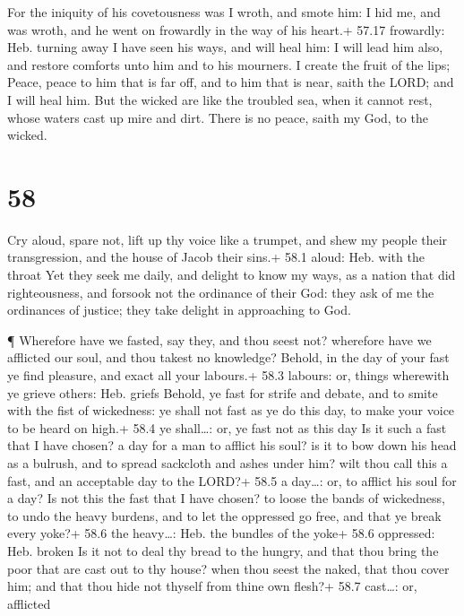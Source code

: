  For the iniquity of his covetousness was I wroth, and
smote him: I hid me, and was wroth, and he went on frowardly in the way
of his heart.+ 57.17 frowardly: Heb. turning away  I have
seen his ways, and will heal him: I will lead him also, and restore
comforts unto him and to his mourners.  I create the fruit
of the lips; Peace, peace to him that is far off, and to him that is
near, saith the LORD; and I will heal him.  But the wicked
are like the troubled sea, when it cannot rest, whose waters cast up
mire and dirt.  There is no peace, saith my God, to the
wicked.

\hypertarget{section-57}{%
\section{58}\label{section-57}}

 Cry aloud, spare not, lift up thy voice like a trumpet, and
shew my people their transgression, and the house of Jacob their sins.+
58.1 aloud: Heb. with the throat  Yet they seek me daily,
and delight to know my ways, as a nation that did righteousness, and
forsook not the ordinance of their God: they ask of me the ordinances of
justice; they take delight in approaching to God.

 ¶ Wherefore have we fasted, say they, and thou seest not?
wherefore have we afflicted our soul, and thou takest no knowledge?
Behold, in the day of your fast ye find pleasure, and exact all your
labours.+ 58.3 labours: or, things wherewith ye grieve others: Heb.
griefs  Behold, ye fast for strife and debate, and to smite
with the fist of wickedness: ye shall not fast as ye do this day, to
make your voice to be heard on high.+ 58.4 ye shall\ldots: or, ye fast
not as this day  Is it such a fast that I have chosen? a day
for a man to afflict his soul? is it to bow down his head as a bulrush,
and to spread sackcloth and ashes under him? wilt thou call this a fast,
and an acceptable day to the LORD?+ 58.5 a day\ldots: or, to afflict his
soul for a day?  Is not this the fast that I have chosen? to
loose the bands of wickedness, to undo the heavy burdens, and to let the
oppressed go free, and that ye break every yoke?+ 58.6 the heavy\ldots:
Heb. the bundles of the yoke+ 58.6 oppressed: Heb. broken 
Is it not to deal thy bread to the hungry, and that thou bring the poor
that are cast out to thy house? when thou seest the naked, that thou
cover him; and that thou hide not thyself from thine own flesh?+ 58.7
cast\ldots: or, afflicted

